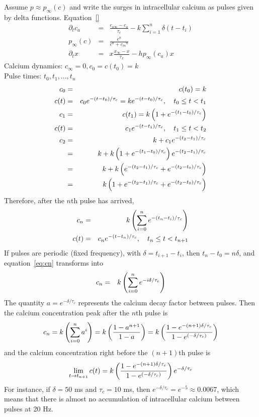 \documentclass[10pt]{article}
\begin{document}
Assume $p \approx p_{\infty}(c)$ and write the surges in intracellular calcium as pulses given by delta functions. Equation~\eqref{}
\begin{eqnarray}
\partial_t c_a &=& \frac{c_{a\infty}-c_a}{\tau_c} - k \sum_{i=1}^n \delta(t-t_i) \\
p_{\infty}(c) &=& \frac{c^n}{c^n + {c_m}^n} 
\\
\partial_t x &=& x \frac{x_{\infty}-x}{\tau_x} - h p_{\infty}(c_a) x
\end{eqnarray}
Calcium dynamics: $c_{\infty} = 0 , c_0 = c(t_0) = k $
\\
Pulse times: $t_0, t_1, ..., t_n$
\begin{eqnarray*}
c_0 &=& c(t_0) = k
\\
c(t) &=& c_0 e^{-(t-t_0)/\tau_c}
=k e^{-(t-t_0)/\tau_c}, \quad t_0\leq t <t_1
\\
c_1 &=& c(t_1) = k \left(1 + e^{-(t_1-t_0)/\tau_c}\right)
\\
c(t) &=& c_1 e^{-(t-t_1)/\tau_c}, \quad t_1\leq t <t_2
\\
c_2 &=& k+ c_1 e^{-(t_2-t_1)/\tau_c}  
\\
&=& k+ k \left(1 + e^{-(t_1-t_0)/\tau_c}\right) e^{-(t_2-t_1)/\tau_c} 
\\
&=& k+ k  \left(e^{-(t_2-t_1)/\tau_c}  + e^{-(t_2-t_0)/\tau_c}\right) 
\\
&=& k \left(1+e^{-(t_2-t_1)/\tau_c}  + e^{-(t_2-t_0)/\tau_c}\right)
\end{eqnarray*}
Therefore, after the $n$th pulse has arrived,
\begin{eqnarray}
c_n &=& k \left( 
\sum_{i=0}^{n} e^{-(t_n-t_{i})/\tau_c} 
\right)
\label{eq:cn}
\\
c(t) &=& c_n e^{-(t-t_n)/\tau_c}, \quad t_n\leq t <t_{n+1}
\label{eq:c(t)tn}
\end{eqnarray}
If pulses are periodic (fixed frequency), with $\delta = t_{i+1}-t_i$, then $t_n - t_0 = n \delta$, and equation~\eqref{eq:cn} transforms into
\begin{eqnarray}
c_n &=& k \left( 
\sum_{i=0}^{n} e^{-i\delta/\tau_c} 
\right)
\label{eq:cnPeriodicPulses}
\end{eqnarray}
The quantity $a = e^{-\delta/\tau_c}$ represents the calcium decay factor between pulses. Then the calcium concentration peak after the $n$th pulse is 
\begin{equation}
c_n=k \left( 
\sum_{i=0}^{n} a^{i} 
\right)
= k \left(\frac{1-a^{n+1}}{1-a}\right)
= k \left(\frac{1-e^{-\left(n+1\right) \delta/\tau_c}}{1-e^{\left(- \delta/\tau_c\right)}}\right)
\end{equation}
and the calcium concentration right before the $(n+1)$th pulse is 
\begin{equation}
\lim_{t\rightarrow t_{n+1}} c(t)
= k \left(\frac{1-e^{-\left(n+1\right) \delta/\tau_c}}{1-e^{\left(- \delta/\tau_c\right)}}\right) e^{-\delta/\tau_c}
\end{equation}
For instance, if $\delta=50$ ms and $\tau_c = 10$ ms, then $e^{-\delta/\tau_c}=e^{-5}\approx 0.0067$, which means that there is almost no accumulation of intracellular calcium between pulses at 20 Hz. 
\end{document}
